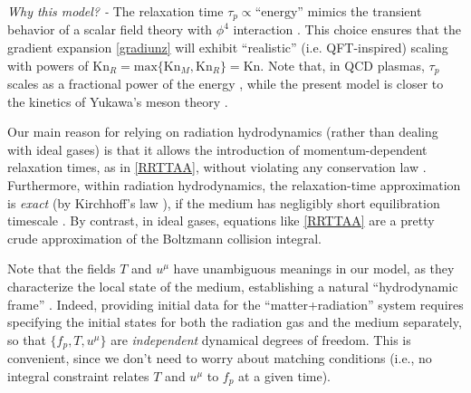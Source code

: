 \documentclass[a4paper, amsfonts, amssymb, amsmath, reprint, showkeys, twoside,notitlepage]{revtex4-2}
\newcommand{\Kn}{\text{Kn}}
\begin{document}
\textit{Why this model? -} 
The relaxation time $\tau_p \propto \text{``energy''}$ mimics the transient behavior of a scalar field theory with $\phi^4$ interaction \cite{DenicolNoronhaRTA2022bsq}. This choice ensures that the gradient expansion \eqref{gradiunz} will exhibit ``realistic'' (i.e. QFT-inspired) scaling with powers of $\Kn_R=\text{max}\{\Kn_M,\Kn_R \}=\Kn$. Note that, in QCD plasmas, $\tau_p$ scales as a fractional power of the energy \cite{Dusling:2009df}, while the present model is closer to the kinetics of Yukawa's meson theory \cite{Srednicki:2007qs,GavassinoGapless2024rck}.

Our main reason for relying on radiation hydrodynamics (rather than dealing with ideal gases) is that it allows the introduction of momentum-dependent relaxation times, as in \eqref{RRTTAA}, without violating any conservation law \cite{RochaNovelRelaxation2021zcw}. Furthermore, within radiation hydrodynamics, the relaxation-time approximation is \textit{exact} (by Kirchhoff's law \cite{ClaytonBook1983}), if the medium has negligibly short equilibration timescale \cite{Pomraning1973,mihalas_book}. By contrast, in ideal gases, equations like \eqref{RRTTAA} are a pretty crude approximation of the Boltzmann collision integral. 



Note that the fields $T$ and $u^\mu$ have unambiguous meanings in our model, as they characterize the local state of the medium, establishing a natural ``hydrodynamic frame'' \cite{Kovtun2019}. Indeed, providing initial data for the ``matter+radiation'' system requires specifying the initial states for both the radiation gas and the medium separately, so that $\{f_p,T,u^\mu\}$ are \textit{independent} dynamical degrees of freedom. This is convenient, since we don't need to worry about matching conditions \cite{RochaBDNK2022ind} (i.e., no integral constraint relates $T$ and $u^\mu$ to $f_p$ at a given time).
\end{document}

